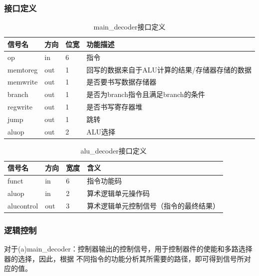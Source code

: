 \subsubsection{接口定义}
\begin{table}[htp]
	\caption{main\_decoder接口定义}\label{tab:maindecoderdef}
	\begin{center}
		\begin{tabular}{|l|l|l|p{6cm}|}
		\hline
		\textbf{信号名} & \textbf{方向} & \textbf{位宽} & \textbf{功能描述}\\ \hline \hline
		op         & in    & 6     & 指令\\ \hline
		memtoreg   & out   & 1     & 回写的数据来自于ALU计算的结果/存储器存储的数据\\ \hline
		memwrite   & out   & 1     & 是否要书写数据存储器\\ \hline
		branch     & out   & 1     & 是否为branch指令且满足branch的条件\\ \hline
		regwrite   & out   & 1     & 是否书写寄存器堆\\ \hline
		jump       & out   & 1     & 跳转\\ \hline
		aluop      & out   & 2     & ALU选择\\ 
		\hline
		\end{tabular}
	\end{center}
	\end{table}
	
\begin{table}[htp]
	\caption{alu\_decoder接口定义}\label{tab:aludecoderdef}
	\begin{center}
		\begin{tabular}{|l|l|l|p{6cm}|}
		\hline
		\textbf{信号名} & \textbf{方向} & \textbf{宽度} & \textbf{含义}\\ \hline \hline
		funct & in & 6 & 指令功能码 \\ 
		aluop & in & 2 & 算术逻辑单元操作码 \\ 
		alucontrol & out & 3 & 算术逻辑单元控制信号（指令的最终结果） \\ 
		\hline
		\end{tabular}
	\end{center}
	\end{table}
		
\subsubsection{逻辑控制}
对于(a)main\_decoder：控制器输出的控制信号，用于控制器件的使能和多路选择器的选择，因此，根据 
不同指令的功能分析其所需要的路径，即可得到信号所对应的值。


